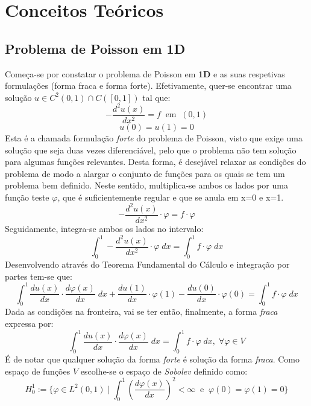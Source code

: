 \documentclass{article}
\theoremstyle{definition}
\theoremstyle{plain}
\numberwithin{equation}{section}
\newcommand{\tab}{\hspace{10mm}}
\begin{document}
\section{Conceitos Teóricos}
\subsection{Problema de Poisson em 1D}
\tab Começa-se por constatar o problema de Poisson em \textbf{1D} e as suas respetivas formulações (forma fraca e forma forte). Efetivamente, quer-se encontrar uma solução $u \in C^2(0,1)\cap C([0,1])$ tal que:
\begin{equation*}
    -\frac{d^2u(x)}{dx^2} = f \; \; \textrm{em} \; \; (0,1)
\end{equation*}
\begin{equation*}
    u(0)=u(1)=0
\end{equation*}
   Esta é a chamada formulação \emph{forte} do problema de Poisson, visto que exige uma solução que seja duas vezes diferenciável, pelo que o problema não tem solução para algumas funções relevantes. Desta forma, é desejável relaxar as condições do problema de modo a alargar o conjunto de funções para os quais se tem um problema bem definido. Neste sentido, multiplica-se ambos os lados por uma função teste $\varphi$, que é suficientemente regular e que se anula em x=0 e x=1.
  \begin{equation*}
      -\frac{d^2u(x)}{dx^2} \cdot \varphi = f \cdot \varphi
  \end{equation*}
   Seguidamente, integra-se ambos os lados no intervalo: 
   \begin{equation*}
       \int_{0}^{1} -\frac{d^2u(x)}{dx^2} \cdot \varphi \; dx  =\int_{0}^{1} f \cdot \varphi \; dx
   \end{equation*} 
   Desenvolvendo através do Teorema Fundamental do Cálculo e integração por partes tem-se que:
   \begin{equation*}
       \int_{0}^{1} \frac{du(x)}{dx} \cdot \frac{d\varphi(x)}{dx} \; dx + \frac{du(1)}{dx} \cdot \varphi(1) - \frac{du(0)}{dx} \cdot \varphi(0) = \int_{0}^{1} f \cdot \varphi \;dx
   \end{equation*}
 Dada as condições na fronteira, vai se ter então, finalmente, a  forma \emph{fraca} expressa por:
 \begin{equation*}
     \int_{0}^{1} \frac{du(x)}{dx} \cdot \frac{d\varphi(x)}{dx} \; dx = \int_{0}^{1} f \cdot \varphi \; dx,\; \forall \varphi  \in V
 \end{equation*}
 É de notar que qualquer solução da forma \emph{forte} é solução da forma \emph{fraca}. Como espaço de funções $V$ escolhe-se o espaço de \emph{Sobolev} definido como:
 \begin{equation*}
     H_0^1:=\{ \varphi \in  L^2(0,1) \; | \; \int_{0}^{1} (\frac{d\varphi(x)}{dx})^2 < \infty \; \; \textrm{e} \; \; \varphi(0)=\varphi(1)=0 \}
 \end{equation*}
\end{document}
